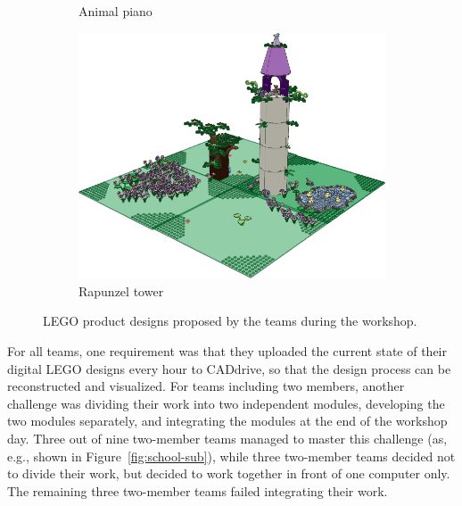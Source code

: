 \documentclass{PDS}
\begin{document}
\begin{figure}[htbp]
\begin{subfigure}[b]{0.3\textwidth}
        \caption{Animal piano}
        \label{fig:piano}
    \end{subfigure}
    \hfill
    \begin{subfigure}[b]{0.3\textwidth}
        \includegraphics[width=\textwidth]{./figures/rapunzel.png}
        \caption{Rapunzel tower}
        \label{fig:rapunzel}
    \end{subfigure}
    \caption{LEGO product designs proposed by the teams during the workshop.}
    \label{fig:kinderuni}
\end{figure}

For all teams, one requirement was that they uploaded the current state of their digital LEGO designs every hour to CADdrive, so that the design process can be reconstructed and visualized.
For teams including two members, another challenge was dividing their work into two independent modules, developing the two modules separately, and integrating the modules at the end of the workshop day.
Three out of nine two-member teams managed to master this challenge (as, e.g., shown in Figure~\ref{fig:school-sub}), while three two-member teams decided not to divide their work, but decided to work together in front of one computer only.
The remaining three two-member teams failed integrating their work.
\end{document}
